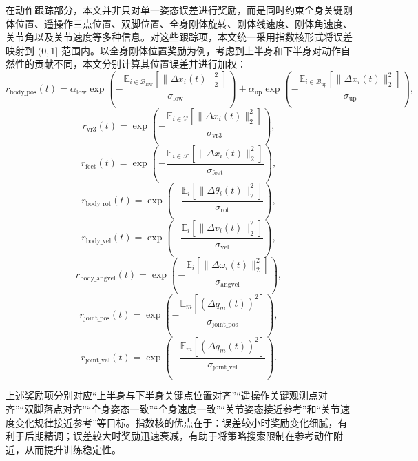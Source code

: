 在动作跟踪部分，本文并非只对单一姿态误差进行奖励，而是同时约束全身关键刚体位置、遥操作三点位置、双脚位置、全身刚体旋转、刚体线速度、刚体角速度、关节角以及关节速度等多种信息。对这些跟踪项，本文统一采用指数核形式将误差映射到 $(0,1]$ 范围内。以全身刚体位置奖励为例，考虑到上半身和下半身对动作自然性的贡献不同，本文分别计算其位置误差并进行加权：
\begin{equation}
r_{\mathrm{body\_pos}}(t)
=
\alpha_{\mathrm{low}}
\exp\left(
-\frac{\mathbb{E}_{i\in\mathcal{B}_{\mathrm{low}}}\left[\|\Delta x_i(t)\|_2^2\right]}{\sigma_{\mathrm{low}}}
\right)
+
\alpha_{\mathrm{up}}
\exp\left(
-\frac{\mathbb{E}_{i\in\mathcal{B}_{\mathrm{up}}}\left[\|\Delta x_i(t)\|_2^2\right]}{\sigma_{\mathrm{up}}}
\right),
\end{equation}
\begin{equation}
r_{\mathrm{vr3}}(t)
=
\exp\left(
-\frac{\mathbb{E}_{i\in\mathcal{V}}\left[\|\Delta x_i(t)\|_2^2\right]}{\sigma_{\mathrm{vr3}}}
\right),
\end{equation}
\begin{equation}
r_{\mathrm{feet}}(t)
=
\exp\left(
-\frac{\mathbb{E}_{i\in\mathcal{F}}\left[\|\Delta x_i(t)\|_2^2\right]}{\sigma_{\mathrm{feet}}}
\right),
\end{equation}
\begin{equation}
r_{\mathrm{body\_rot}}(t)
=
\exp\left(
-\frac{\mathbb{E}_i\left[\|\Delta \theta_i(t)\|_2^2\right]}{\sigma_{\mathrm{rot}}}
\right),
\end{equation}
\begin{equation}
r_{\mathrm{body\_vel}}(t)
=
\exp\left(
-\frac{\mathbb{E}_i\left[\|\Delta v_i(t)\|_2^2\right]}{\sigma_{\mathrm{vel}}}
\right),
\end{equation}
\begin{equation}
r_{\mathrm{body\_angvel}}(t)
=
\exp\left(
-\frac{\mathbb{E}_i\left[\|\Delta \omega_i(t)\|_2^2\right]}{\sigma_{\mathrm{angvel}}}
\right),
\end{equation}
\begin{equation}
r_{\mathrm{joint\_pos}}(t)
=
\exp\left(
-\frac{\mathbb{E}_{m}\left[(\Delta q_m(t))^2\right]}{\sigma_{\mathrm{joint\_pos}}}
\right),
\end{equation}
\begin{equation}
r_{\mathrm{joint\_vel}}(t)
=
\exp\left(
-\frac{\mathbb{E}_{m}\left[(\Delta \dot{q}_m(t))^2\right]}{\sigma_{\mathrm{joint\_vel}}}
\right).
\end{equation}

上述奖励项分别对应“上半身与下半身关键点位置对齐”“遥操作关键观测点对齐”“双脚落点对齐”“全身姿态一致”“全身速度一致”“关节姿态接近参考”和“关节速度变化规律接近参考”等目标。指数核的优点在于：误差较小时奖励变化细腻，有利于后期精调；误差较大时奖励迅速衰减，有助于将策略搜索限制在参考动作附近，从而提升训练稳定性。

